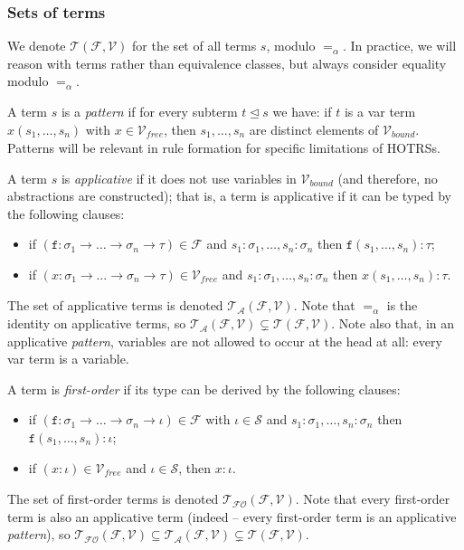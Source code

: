 \documentclass{lmcs}
\theoremstyle{theorem}\newtheorem{theorem}{Theorem}
\theoremstyle{theorem}\newtheorem{lemma}[theorem]{Lemma}
\theoremstyle{theorem}\newtheorem{corollary}[theorem]{Corollary}
\theoremstyle{definition}\newtheorem{definition}[theorem]{Definition}
\theoremstyle{definition}\newtheorem{example}[theorem]{Example}
\newcommand{\F}{\mathcal{F}}
\newcommand{\V}{\mathcal{V}}
\newcommand{\Vfree}{\mathcal{V}_{\mathit{free}}}
\newcommand{\Vbound}{\mathcal{V}_{\mathit{bound}}}
\newcommand{\Sorts}{\mathcal{S}}
\newcommand{\Terms}{\mathcal{T}}
\newcommand{\ATerms}{\mathcal{T}_{\mathcal{A}}}
\newcommand{\FOTerms}{\mathcal{T}_{\mathcal{FO}}}
\newcommand{\asort}{\iota}
\newcommand{\atype}{\sigma}
\newcommand{\btype}{\tau}
\newcommand{\identifier}[1]{\mathtt{#1}}
\newcommand{\afun}{\identifier{f}}
\newcommand{\avar}{x}
\newcommand{\abs}[2]{\lambda #1.#2}
\newcommand{\arrtype}{\rightarrow}
\newcommand{\subtermeq}{\unlhd}
\newcommand{\mysubsection}[1]{\vspace{-12pt}\subsubsection{#1}}
\begin{document}
%

\mysubsection{Sets of terms}

We denote $\Terms(\F,\V)$ for the set of all terms $s$, modulo $=_\alpha$.  In practice, we will
reason with terms rather than equivalence classes, but always consider equality modulo $=_\alpha$.

A term $s$ is a \emph{pattern} if for every subterm $t \subtermeq s$ we have: if $t$ is a var term
$x(s_1,\dots,s_n)$ with $x \in \Vfree$, then $s_1,\dots,s_n$ are distinct elements of $\Vbound$.
Patterns will be relevant in rule formation for specific limitations of HOTRSs.

A term $s$ is \emph{applicative} if it does not use variables in $\Vbound$ (and therefore, no
abstractions are constructed); that is, a term is applicative if it can be typed by the
following clauses:
\begin{itemize}
\item if $(\afun : \atype_1 \arrtype \dots \arrtype \atype_n \arrtype \btype) \in \F$ and
  $s_1 : \atype_1,\dots,s_n : \atype_n$ then $\afun(s_1,\dots,s_n) : \btype$;
\item if $(\avar : \atype_1 \arrtype \dots \arrtype \atype_n \arrtype \btype) \in \Vfree$ and
  $s_1 : \atype_1,\dots,s_n : \atype_n$ then $\avar(s_1,\dots,s_n) : \btype$.
\end{itemize}
The set of applicative terms is denoted $\ATerms(\F,\V)$.  Note that $=_\alpha$ is the
identity on applicative terms, so $\ATerms(\F,\V) \subsetneq \Terms(\F,\V)$.
Note also that, in an applicative \emph{pattern}, variables are not allowed to occur at the head
at all: every var term is a variable.

A term is \emph{first-order} if its type can be derived by the following clauses:
\begin{itemize}
\item if $(\afun : \atype_1 \arrtype \dots \arrtype \atype_n \arrtype \asort) \in \F$ with $\asort
  \in \Sorts$ and
  $s_1 : \atype_1,\dots,s_n : \atype_n$ then $\afun(s_1,\dots,s_n) : \asort$;
\item if $(\avar : \asort) \in \Vfree$ and $\asort \in \Sorts$, then $\avar : \asort$.
\end{itemize}
The set of first-order terms is denoted $\FOTerms(\F,\V)$.  Note that every first-order term is
also an applicative term (indeed -- every first-order term is an applicative \emph{pattern}),
so $\FOTerms(\F,\V) \subseteq \ATerms(\F,\V) \subsetneq \Terms(\F,\V)$.
\end{document}
